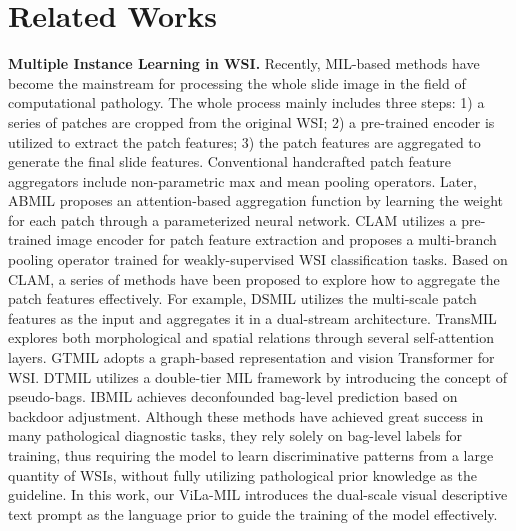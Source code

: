 \section{Related Works}
\noindent\textbf{Multiple Instance Learning in WSI.}
Recently, MIL-based methods \cite{ilse2018attention, li2021dual, H2MIL, shao2021transmil, lu2021data, zheng2021deep, zhang2022dtfd, lu2023visual, huang2023conslide} have become the mainstream for processing the whole slide image in the field of computational pathology. The whole process mainly includes three steps: 1) a series of patches are cropped from the original WSI; 2) a pre-trained encoder is utilized to extract the patch features; 3) the patch features are aggregated to generate the final slide features. Conventional handcrafted patch feature aggregators include non-parametric max and mean pooling operators. Later, ABMIL \cite{ilse2018attention} proposes an attention-based aggregation function by learning the weight for each patch through a parameterized neural network. CLAM \cite{lu2021data} utilizes a pre-trained image encoder for patch feature extraction and proposes a multi-branch pooling operator trained for weakly-supervised WSI classification tasks. 
Based on CLAM, a series of methods \cite{shao2021transmil, zheng2021deep, zhang2022dtfd, lu2023visual, li2021dual} have been proposed to explore how to aggregate the patch features effectively. 
For example, DSMIL \cite{li2021dual} utilizes the multi-scale patch features as the input and aggregates it in a dual-stream architecture. 
TransMIL \cite{shao2021transmil} explores both morphological and spatial relations through several self-attention layers. 
GTMIL \cite{zheng2021deep} adopts a graph-based representation and vision Transformer for WSI. 
DTMIL \cite{zhang2022dtfd} utilizes a double-tier MIL framework by introducing the concept of pseudo-bags.
IBMIL \cite{lin2023interventional} achieves deconfounded bag-level prediction based on backdoor adjustment.
Although these methods have achieved great success in many pathological diagnostic tasks, they rely solely on bag-level labels for training, thus requiring the model to learn discriminative patterns from a large quantity of WSIs, without fully utilizing pathological prior knowledge as the guideline. 
In this work, our ViLa-MIL introduces the dual-scale visual descriptive text prompt as the language prior to guide the training of the model effectively. 

